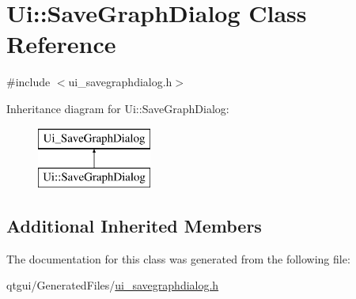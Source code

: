 \hypertarget{class_ui_1_1_save_graph_dialog}{}\section{Ui\+::Save\+Graph\+Dialog Class Reference}
\label{class_ui_1_1_save_graph_dialog}


{\ttfamily \#include $<$ui\+\_\+savegraphdialog.\+h$>$}

Inheritance diagram for Ui\+::Save\+Graph\+Dialog\+:\begin{figure}[H]
\begin{center}
\leavevmode
\includegraphics[height=2.000000cm]{de/d71/class_ui_1_1_save_graph_dialog}
\end{center}
\end{figure}
\subsection*{Additional Inherited Members}


The documentation for this class was generated from the following file\+:\begin{DoxyCompactItemize}
\item 
qtgui/\+Generated\+Files/\mbox{\hyperlink{ui__savegraphdialog_8h}{ui\+\_\+savegraphdialog.\+h}}\end{DoxyCompactItemize}
